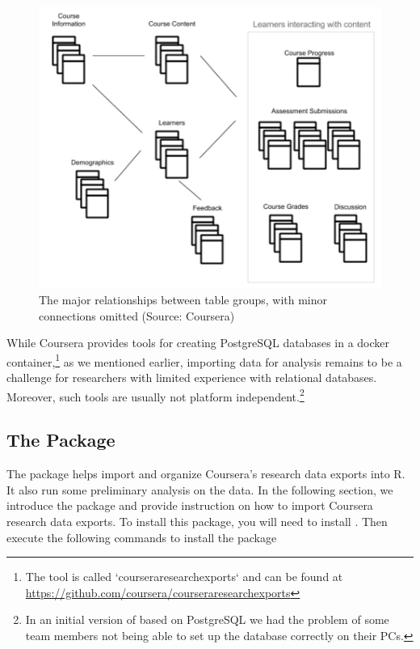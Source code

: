 \begin{figure}[htbp]
    \centering
    \includegraphics[scale=0.5]{datatables}
    \caption{The major relationships between table groups, with minor connections omitted (Source: Coursera)}
    \label{figure:datatables}
\end{figure}

While Coursera provides tools for creating PostgreSQL databases in a
docker
container,\footnote{The tool is called `courseraresearchexports` and can be found at \url{https://github.com/coursera/courseraresearchexports}}
as we mentioned earlier, importing data for analysis remains to be a
challenge for researchers with limited experience with relational
databases. Moreover, such tools are usually not platform
independent.\footnote{In an initial version of  based on PostgreSQL we had the problem of some team members not being able to set up the database correctly on their PCs.}

\subsection{\texorpdfstring{The 
Package}{The  Package}}\label{the-package}

The  package helps import and organize Coursera's research
data exports into R. It also run some preliminary analysis on the data.
In the following section, we introduce the package and provide
instruction on how to import Coursera research data exports. To install
this package, you will need to install 
\citep{devtools}. Then execute the following commands to install the
 package

